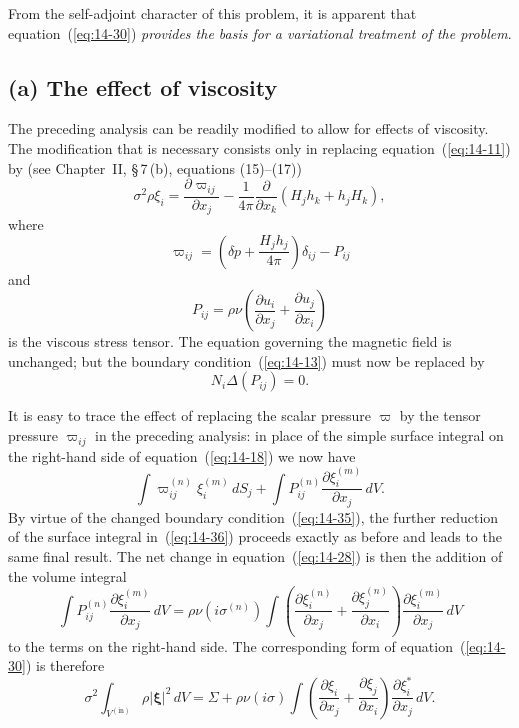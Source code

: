 From the self-adjoint character of this problem, it is apparent that equation~(\ref{eq:14-30}) \emph{provides the basis for a variational treatment of the problem}.

\subsection*{(a) The effect of viscosity}

The preceding analysis can be readily modified to allow for effects of viscosity. The modification that is necessary consists only in replacing equation~(\ref{eq:14-11}) by (see Chapter~II, \S\,7\,(b), equations (15)--(17))
\begin{equation}
\label{eq:14-32}
\sigma^2 \rho \xi_i = \frac{\partial \varpi_{ij}}{\partial x_j} - \frac{1}{4\pi} \frac{\partial}{\partial x_k} (H_j h_k + h_j H_k),
\end{equation}
where
\begin{equation}
\label{eq:14-33}
\varpi_{ij} = \left(\delta p + \frac{H_j h_j}{4\pi}\right) \delta_{ij} - P_{ij}
\end{equation}
and
\begin{equation}
\label{eq:14-34}
P_{ij} = \rho \nu \left( \frac{\partial u_i}{\partial x_j} + \frac{\partial u_j}{\partial x_i} \right)
\end{equation}
is the viscous stress tensor. The equation governing the magnetic field is unchanged; but the boundary condition~(\ref{eq:14-13}) must now be replaced by
\begin{equation}
\label{eq:14-35}
N_i \Delta(P_{ij}) = 0.
\end{equation}

It is easy to trace the effect of replacing the scalar pressure $\varpi$ by the tensor pressure $\varpi_{ij}$ in the preceding analysis: in place of the simple surface integral on the right-hand side of equation~(\ref{eq:14-18}) we now have
\begin{equation}
\label{eq:14-36}
\int \varpi_{ij}^{(n)} \xi_i^{(m)} \, dS_j + \int P_{ij}^{(n)} \frac{\partial \xi_i^{(m)}}{\partial x_j} \, dV.
\end{equation}
By virtue of the changed boundary condition~(\ref{eq:14-35}), the further reduction of the surface integral in~(\ref{eq:14-36}) proceeds exactly as before and leads to the same final result. The net change in equation~(\ref{eq:14-28}) is then the addition of the volume integral
\begin{equation}
\label{eq:14-37}
\int P_{ij}^{(n)} \frac{\partial \xi_i^{(m)}}{\partial x_j} \, dV = \rho \nu (i\sigma^{(n)}) \int \left( \frac{\partial \xi_i^{(n)}}{\partial x_j} + \frac{\partial \xi_j^{(n)}}{\partial x_i} \right) \frac{\partial \xi_i^{(m)}}{\partial x_j} \, dV
\end{equation}
to the terms on the right-hand side. The corresponding form of equation~(\ref{eq:14-30}) is therefore
\begin{equation}
\label{eq:14-38}
\sigma^2 \int_{V^{(\mathrm{in})}} \rho |\boldsymbol{\xi}|^2 \, dV = \Sigma + \rho \nu (i\sigma) \int \left( \frac{\partial \xi_i}{\partial x_j} + \frac{\partial \xi_j}{\partial x_i} \right) \frac{\partial \xi_i^*}{\partial x_j} \, dV.
\end{equation}

